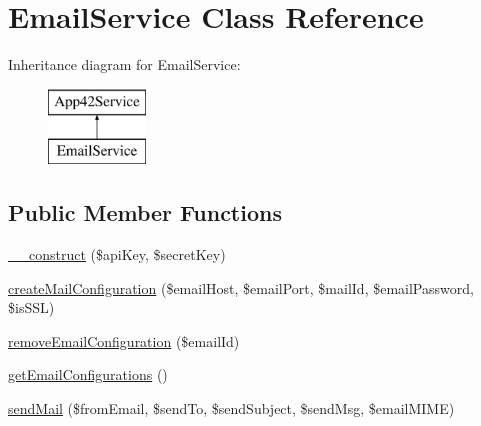 \hypertarget{class_email_service}{\section{Email\+Service Class Reference}
\label{class_email_service}
}
Inheritance diagram for Email\+Service\+:\begin{figure}[H]
\begin{center}
\leavevmode
\includegraphics[height=2.000000cm]{class_email_service}
\end{center}
\end{figure}
\subsection*{Public Member Functions}
\begin{DoxyCompactItemize}
\item 
\hyperlink{class_email_service_a49f2ad222e06420736d750e167d55d7c}{\+\_\+\+\_\+construct} (\$api\+Key, \$secret\+Key)
\item 
\hyperlink{class_email_service_a2a52e05f8a0dae9264fcecca809b2b5e}{create\+Mail\+Configuration} (\$email\+Host, \$email\+Port, \$mail\+Id, \$email\+Password, \$is\+S\+S\+L)
\item 
\hyperlink{class_email_service_ab173fb63800214851d5f4f9799886103}{remove\+Email\+Configuration} (\$email\+Id)
\item 
\hyperlink{class_email_service_a97e62399a978f9492280b8dcc8d58e11}{get\+Email\+Configurations} ()
\item 
\hyperlink{class_email_service_a94e38b5d97aac3e743674ce956218911}{send\+Mail} (\$from\+Email, \$send\+To, \$send\+Subject, \$send\+Msg, \$email\+M\+I\+M\+E)
\end{DoxyCompactItemize}
